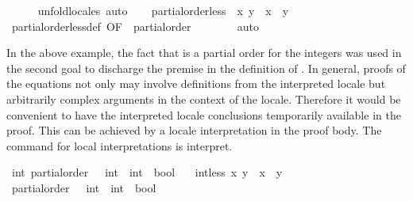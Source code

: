 \begin{isabellebody}
\ \ \ \ \isamarkupfalse%
\ unfold{\isacharunderscore}{\kern0pt}locales\ auto\isanewline
\ \ \isamarkupfalse%
\ {\isachardoublequoteopen}partial{\isacharunderscore}{\kern0pt}order{\isachardot}{\kern0pt}less\ {\isacharparenleft}{\kern0pt}{\isasymle}{\isacharparenright}{\kern0pt}\ x\ y\ {\isacharequal}{\kern0pt}\ {\isacharparenleft}{\kern0pt}x\ {\isacharless}{\kern0pt}\ y{\isacharparenright}{\kern0pt}{\isachardoublequoteclose}\isanewline
\ \ \ \ \isamarkupfalse%
\ partial{\isacharunderscore}{\kern0pt}order{\isachardot}{\kern0pt}less{\isacharunderscore}{\kern0pt}def\ {\isacharbrackleft}{\kern0pt}OF\ {\isacartoucheopen}\ partial{\isacharunderscore}{\kern0pt}order\ {\isacharparenleft}{\kern0pt}{\isasymle}{\isacharparenright}{\kern0pt}\ {\isacartoucheclose}{\isacharbrackright}{\kern0pt}\isanewline
\ \ \ \ \isamarkupfalse%
\ auto\isanewline
{}\isamarkupfalse%
%
\endisatagproof
{\isafoldproof}%
%
\isadelimproof
%
\endisadelimproof
%
\begin{isamarkuptext}%
In the above example, the fact that \isa{{\isasymle}} is a partial order for the integers
was used in the second goal to discharge the premise in the definition of \isa{{\isasymsqsubseteq}}.
In general, proofs of the equations not only may involve definitions from the
interpreted locale but arbitrarily complex arguments in the context of the
locale. Therefore it would be convenient to have the interpreted locale conclusions temporarily available in the proof. 
This can be achieved by a locale interpretation in the proof body. The command for local interpretations is
interpret.%
\end{isamarkuptext}\isamarkuptrue%
\isamarkupfalse%
\ int{\isacharcolon}{\kern0pt}\ partial{\isacharunderscore}{\kern0pt}order\ {\isachardoublequoteopen}{\isacharparenleft}{\kern0pt}{\isasymle}{\isacharparenright}{\kern0pt}\ {\isacharcolon}{\kern0pt}{\isacharcolon}{\kern0pt}\ int\ {\isasymRightarrow}\ int\ {\isasymRightarrow}\ bool{\isachardoublequoteclose}\isanewline
\ \ \ {\isachardoublequoteopen}int{\isachardot}{\kern0pt}less\ x\ y\ {\isacharequal}{\kern0pt}\ {\isacharparenleft}{\kern0pt}x\ {\isacharless}{\kern0pt}\ y{\isacharparenright}{\kern0pt}{\isachardoublequoteclose}\isanewline
%
\isadelimproof
%
\endisadelimproof
%
\isatagproof
{}\isamarkupfalse%
\ {\isacharminus}{\kern0pt}\isanewline
\ \ \isamarkupfalse%
\ {\isachardoublequoteopen}partial{\isacharunderscore}{\kern0pt}order\ {\isacharparenleft}{\kern0pt}{\isacharparenleft}{\kern0pt}{\isasymle}{\isacharparenright}{\kern0pt}\ {\isacharcolon}{\kern0pt}{\isacharcolon}{\kern0pt}\ int\ {\isasymRightarrow}\ int\ {\isasymRightarrow}\ bool{\isacharparenright}{\kern0pt}{\isachardoublequoteclose}\isanewline

\end{isabellebody}

